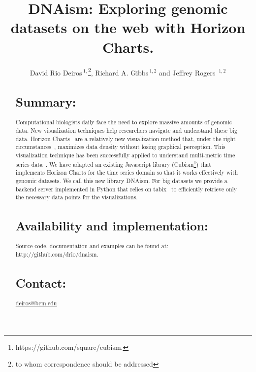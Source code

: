 \documentclass{bioinfo}
\begin{document}

\title[short Title]{DNAism: Exploring genomic datasets on the web with Horizon Charts. }

\author[Sample \textit{et~al}]{David Rio Deiros\,$^{1,}$\footnote{to whom correspondence should be addressed},
Richard A. Gibbs\,$^{1,2}$ and Jeffrey Rogers\, $^{1,2}$}

\address{$^{1}$Human Genome Sequencing Center, Baylor College of Medicine, Houston, TX.\\
$^{2}$Department of Molecular and Human Genetics, Baylor College of Medicine, Houston, TX.}



\maketitle

\begin{abstract}

\section{Summary:}

Computational biologists daily face the need to explore massive amounts of
genomic data.  New visualization techniques help researchers navigate and
understand these big data. Horizon Charts~\citep{time-in-the-horizon} are a
relatively new visualization method that, under the right
circumstances~\citep{2009-horizon}, maximizes data density without losing
graphical perception. This visualization technique has been successfully
applied to understand multi-metric time series
data~\citep{time-in-the-horizon}. We have adapted an existing Javascript
library (Cubism\footnote{https://github.com/square/cubism.}) that implements
Horizon Charts for the time series domain so that it works effectively with
genomic datasets. We call this new library DNAism. For big datasets we provide
a backend server implemented in Python that relies on tabix~\citep{tabix-li} to
efficiently retrieve only the necessary data points for the visualizations.

\section{Availability and implementation:}
Source code, documentation and examples can be found at:
http://github.com/drio/dnaism.

\section{Contact:} \href{deiros@bcm.edu}{deiros@bcm.edu}
\end{abstract}
\end{document}

